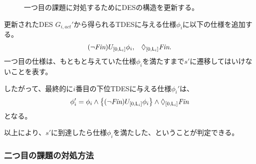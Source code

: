 \documentclass[ 10pt]{jsarticle}
\newcommand{\Len}{{\sf L}}
\begin{document}
%
\begin{figure}[hbt]
\begin{center}
\hspace{0.3cm}
%
%
\hspace{0cm}
%
%
\caption{一つ目の課題に対処するためにDESの構造を更新する。} 
\label{c}
\end{center}
\end{figure}
%

更新されたDES $G_{i,act}'$から得られるTDESに与える仕様$\phi_i$に以下の仕様を追加する。
\begin{align}\label{add_spec}
&(\lnot \textit{Fin})U_{[0,\Len_i]}\phi_i,&\Diamond_{[0,\Len_i]}\textit{Fin}.
\end{align}
一つ目の仕様は、もともと与えていた仕様$\phi_i$を満たすまで$s'$に遷移してはいけないことを表す。

したがって、最終的に$i$番目の下位TDESに与える仕様$\phi_i'$は、
\begin{align}
\phi_i'=\phi_i 
\land\left\{(\lnot \textit{Fin})U_{[0,\Len_i]}\phi_i \right\}
\land \Diamond_{[0,\Len_i]}\textit{Fin}
\end{align}
となる。

以上により、$s'$に到達したら仕様$\phi_i$を満たした、ということが判定できる。
%
%
\subsubsection{二つ目の課題の対処方法}
\label{sec2-1}
%
% 
%
%
\begin{comment}
%
%
%
%

%
二つめの課題の具体例をDES $G_{i,\textit{act}}$から得られる$i$番目の下位TDESをもとに考える。ここで、状態と事象が交互に現れる実行列から事象のみを抜き出した列を事象列と呼ぶ。
仕様は$\phi_i=\Diamond_{0,\Len_i}L(s^*)$とする。
最も短い時間でHard制約を満たす事象列は$a,b,c(\Len_i=3)$である。しかし、$\Len_i=3$では事象列$a,\textit{tick}_i,d$も解として得られる。
この二つの事象列は実行可能解としては区別されない。
\begin{figure}
\begin{center}
\texttt{[image: exa1-crop.pdf]}
\caption{矢印は遷移を表し、その近くの$(\sigma,l_\sigma,u_\sigma)$は遷移に関わる事象$\sigma$とそのlower time $l_\sigma$とupper time $u_\sigma$からなるタプルである。}
\label{exa1}
\end{center}
\end{figure}

% 
%
%
\end{comment}
%
%
%
%
\end{document}
